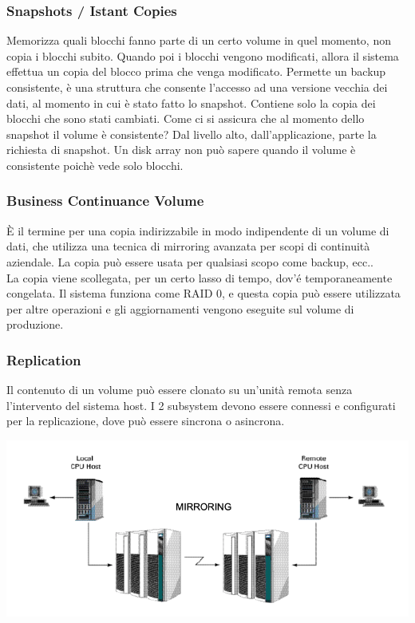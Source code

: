 \documentclass[8pt,a4paper]{extarticle}
\begin{document}
\begin{multicols*}{4}
\subsubsection{Snapshots / Istant Copies}
Memorizza quali blocchi fanno parte di un certo volume in quel momento, non copia i blocchi subito. Quando poi i blocchi vengono modificati, allora il sistema effettua un copia del blocco prima che venga modificato. Permette un backup consistente, è una struttura che consente l'accesso ad una versione vecchia dei dati, al momento in cui è stato fatto lo snapshot. Contiene solo la copia dei blocchi che sono stati cambiati. Come ci si assicura che al momento dello snapshot il volume è consistente? Dal livello alto, dall'applicazione, parte la richiesta di
snapshot. Un disk array non può sapere quando il volume è consistente poichè vede solo blocchi.

\subsubsection{Business Continuance Volume}
È il termine per una copia indirizzabile in modo indipendente di un volume di dati, che utilizza una tecnica di mirroring avanzata per scopi di continuità aziendale. La copia può essere usata per qualsiasi scopo come backup, ecc.. \\ La copia viene scollegata, per un certo lasso di tempo, dov'é temporaneamente congelata. Il sistema funziona come RAID 0, e questa copia può essere utilizzata per altre operazioni e gli aggiornamenti vengono eseguite sul volume di produzione.

\subsubsection{Replication}
Il contenuto di un volume può essere clonato su un'unità remota senza l'intervento del sistema host. I 2 subsystem devono essere connessi e configurati per la replicazione, dove può essere sincrona o asincrona.
\begin{center}
    			\includegraphics[width=.8\linewidth]{src/replication.png}
  		\end{center}
  		

\end{multicols*}
\end{document}
